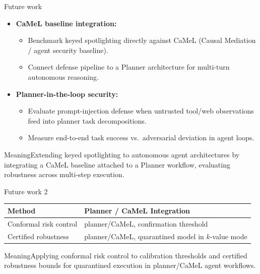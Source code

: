 \documentclass[aspectratio=169,11pt]{beamer}
\newcommand{\plain}[1]{\begin{block}{Meaning}#1\end{block}}
\begin{document}
\begin{frame}{Future work}
  \begin{itemize}
    \item \textbf{CaMeL baseline integration:}
      \begin{itemize}
        \item Benchmark keyed spotlighting directly against CaMeL (Causal Mediation / agent security baseline).
        \item Connect defense pipeline to a Planner architecture for multi-turn autonomous reasoning.
      \end{itemize}
    \vspace{0.4em}
    \item \textbf{Planner-in-the-loop security:}
      \begin{itemize}
        \item Evaluate prompt-injection defense when untrusted tool/web observations feed into planner task decompositions.
        \item Measure end-to-end task success vs.\ adversarial deviation in agent loops.
      \end{itemize}
  \end{itemize}
  \vspace{0.2em}
  \plain{Extending keyed spotlighting to autonomous agent architectures by integrating a CaMeL baseline attached to a Planner workflow, evaluating robustness across multi-step execution.}
\end{frame}

\begin{frame}{Future work 2}
  \vspace{0.3cm}
  \centering
  \renewcommand{\arraystretch}{1.5}
  \begin{tabular}{@{}p{} p{}@{}}
    \toprule
    \textbf{Method} & \textbf{Planner / CaMeL Integration} \\
    \midrule
    Conformal risk control & planner/CaMeL, confirmation threshold \\[0.5em]
    Certified robustness & planner/CaMeL, quarantined model in $k$-value mode \\
    \bottomrule
  \end{tabular}
  \vspace{0.5cm}
  \plain{Applying conformal risk control to calibration thresholds and certified robustness bounds for quarantined execution in planner/CaMeL agent workflows.}
\end{frame}
\end{document}
